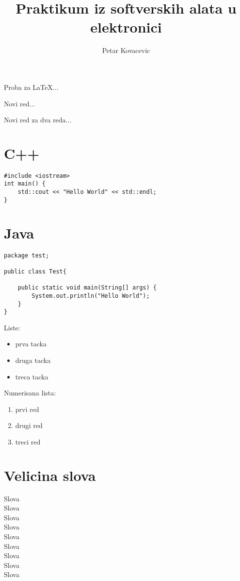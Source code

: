 \documentclass{article}
\author{Petar Kovacevic}
\title{Praktikum iz softverskih alata u elektronici}
\begin{document}
\maketitle

\tableofcontents

\bigskip

Proba za \LaTeX...

Novi red...

Novi red za dva reda...

\section{C++}
\begin{verbatim}
#include <iostream>
int main() {
	std::cout << "Hello World" << std::endl;
}

\end{verbatim}

\section{Java}
\begin{verbatim}
package test;

public class Test{
	
	public static void main(String[] args) {
		System.out.println("Hello World");
	}
}
\end{verbatim}

Liste:
\begin{itemize}
	\item prva tacka
	\item druga tacka
	\item treca tacka
\end{itemize}

Numerisana lista:
\begin{enumerate}
	\item prvi red
	\item drugi red
	\item treci red
\end{enumerate}

\section{Velicina slova}
\Huge Slova\\
\huge Slova\\
\LARGE Slova\\
\Large Slova\\
\large Slova\\
\normalsize Slova\\
\small Slova\\
\footnotesize Slova\\
\tiny Slova
\normalsize
\end{document}
